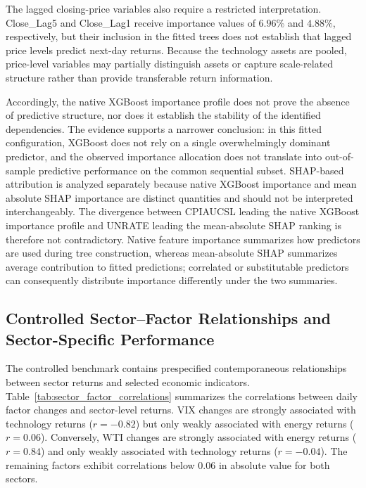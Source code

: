 \documentclass[utf8]{FrontiersinHarvard} %
\newcommand{\rev}[1]{{\color{red}#1}}
\begin{document}
The lagged closing-price variables also require a restricted interpretation. Close\_Lag5 and Close\_Lag1 receive importance values of \(6.96\%\) and \(4.88\%\), respectively, but their inclusion in the fitted trees does not establish that lagged price levels predict next-day returns. Because the technology assets are pooled, price-level variables may partially distinguish assets or capture scale-related structure rather than provide transferable return information.

Accordingly, the native XGBoost importance profile does not prove the absence of predictive structure, nor does it establish the stability of the identified dependencies. The evidence supports a narrower conclusion: in this fitted configuration, XGBoost does not rely on a single overwhelmingly dominant predictor, and the observed importance allocation does not translate into out-of-sample predictive performance on the common sequential subset. SHAP-based attribution is analyzed separately because native XGBoost importance and mean absolute SHAP importance are distinct quantities and should not be interpreted interchangeably. \rev{The divergence between CPIAUCSL leading the native XGBoost importance profile and UNRATE leading the mean-absolute SHAP ranking is therefore not contradictory. Native feature importance summarizes how predictors are used during tree construction, whereas mean-absolute SHAP summarizes average contribution to fitted predictions; correlated or substitutable predictors can consequently distribute importance differently under the two summaries.}

\subsection{Controlled Sector--Factor Relationships and Sector-Specific Performance}
\label{subsec:sector_performance}

The controlled benchmark contains prespecified contemporaneous relationships between sector returns and selected economic indicators. Table~\ref{tab:sector_factor_correlations} summarizes the correlations between daily factor changes and sector-level returns. VIX changes are strongly associated with technology returns (\(r=-0.82\)) but only weakly associated with energy returns (\(r=0.06\)). Conversely, WTI changes are strongly associated with energy returns (\(r=0.84\)) and only weakly associated with technology returns (\(r=-0.04\)). The remaining factors exhibit correlations below \(0.06\) in absolute value for both sectors.
\end{document}
